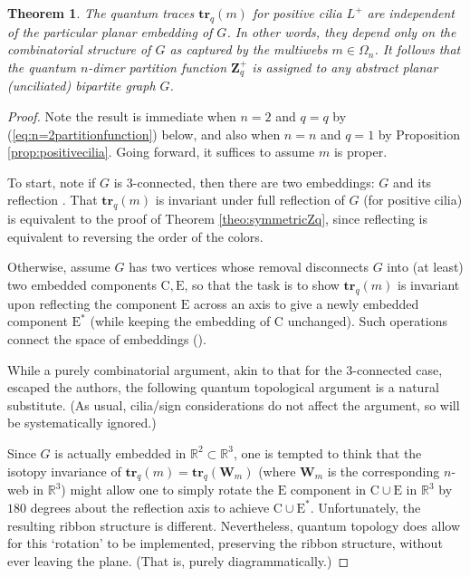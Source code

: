 \documentclass[12pt, reqno]{amsart}
\newtheorem{theo}{Theorem}[section]
\theoremstyle{definition}
\newcommand{\Zq}{\mathbf{Z}_q}%
\newcommand{\R}{\mathbb{R}}%
\newcommand{\Er}{\mathrm{E}^*}
\newcommand{\trq}{\mathbf{tr}_q}%
\begin{document}
\begin{theo}\label{theo:dependenceonplanarembedding}
The quantum traces $\trq(m)$ for positive cilia $L^+$ are independent of the particular planar embedding of $G$.  In other words, they depend only on the combinatorial structure of $G$ as captured by the multiwebs $m\in\Omega_n$.  It follows that the quantum $n$-dimer partition function $\Zq^+$ is assigned to any abstract planar (unciliated) bipartite graph $G$.  
\end{theo}

\begin{proof}
Note the result is immediate when $n=2$ and $q=q$ by (\ref{eq:n=2partitionfunction}) below, and also when $n=n$ and $q=1$ by Proposition \ref{prop:positivecilia}.      Going forward, it suffices to assume $m$ is proper.

To start, note if $G$ is $3$-connected, then there are two embeddings:  $G$ and its reflection \cite{Whitney}.    That $\trq(m)$ is invariant under full reflection of $G$ (for positive cilia) is equivalent to the proof of Theorem \ref{theo:symmetricZq},   since reflecting is equivalent to reversing the order of the colors.  

Otherwise, assume $G$ has two vertices whose removal disconnects $G$ into (at least) two embedded components $\mathrm{C}, \mathrm{E}$,   so that the task is to show $\trq(m)$ is invariant upon reflecting the component $\mathrm{E}$ across an axis to give a newly embedded component $\Er$   (while keeping the embedding of $\mathrm{C}$ unchanged).  Such operations connect the space of embeddings (\cite{Whitney}).

While a purely combinatorial argument, akin to that for the $3$-connected case, escaped the authors, the following quantum topological argument is a natural substitute.  (As usual, cilia/sign considerations do not affect the argument, so will be systematically ignored.)  

Since $G$ is actually embedded in $\R^2\subset\R^3$, one is tempted to think that the isotopy invariance of $\trq(m)=\trq(\mathbf{W}_m)$ (where $\mathbf{W}_m$ is the corresponding $n$-web in $\R^3$) might allow one to simply rotate the $\mathrm{E}$ component in $\mathrm{C}\cup \mathrm{E}$ in $\R^3$ by $180$ degrees about the reflection axis to achieve $\mathrm{C}\cup\Er$.  Unfortunately, the resulting ribbon structure is different.  Nevertheless, quantum topology does allow for this `rotation' to be implemented, preserving the ribbon structure, without ever leaving the plane.  (That is, purely diagrammatically.)  


\end{proof}
\end{document}
